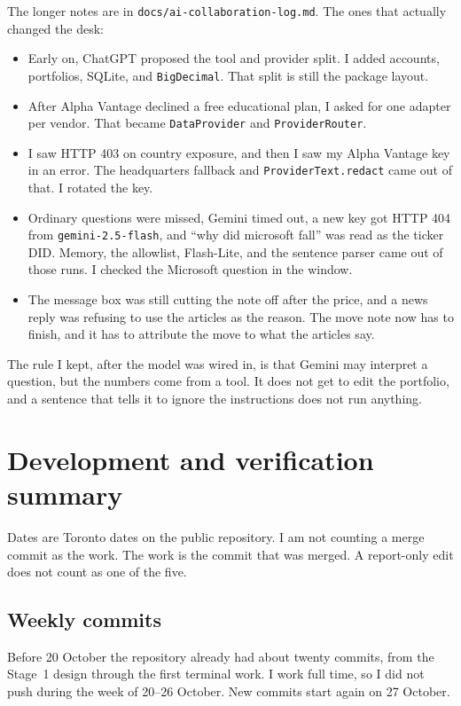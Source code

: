 \documentclass[11pt]{article}
\begin{document}
The longer notes are in \texttt{docs/ai-collaboration-log.md}. The ones that actually changed the desk:

\begin{itemize}
\item Early on, ChatGPT proposed the tool and provider split. I added accounts, portfolios, SQLite, and \texttt{BigDecimal}. That split is still the package layout.
\item After Alpha Vantage declined a free educational plan, I asked for one adapter per vendor. That became \texttt{DataProvider} and \texttt{ProviderRouter}.
\item I saw HTTP 403 on country exposure, and then I saw my Alpha Vantage key in an error. The headquarters fallback and \texttt{ProviderText.redact} came out of that. I rotated the key.
\item Ordinary questions were missed, Gemini timed out, a new key got HTTP 404 from \texttt{gemini-2.5-flash}, and ``why did microsoft fall'' was read as the ticker DID. Memory, the allowlist, Flash-Lite, and the sentence parser came out of those runs. I checked the Microsoft question in the window.
\item The message box was still cutting the note off after the price, and a news reply was refusing to use the articles as the reason. The move note now has to finish, and it has to attribute the move to what the articles say.
\end{itemize}

The rule I kept, after the model was wired in, is that Gemini may interpret a question, but the numbers come from a tool. It does not get to edit the portfolio, and a sentence that tells it to ignore the instructions does not run anything.

\section{Development and verification summary}

Dates are Toronto dates on the public repository. I am not counting a merge commit as the work. The work is the commit that was merged. A report-only edit does not count as one of the five.

\subsection{Weekly commits}
Before 20 October the repository already had about twenty commits, from the Stage~1 design through the first terminal work. I work full time, so I did not push during the week of 20--26 October. New commits start again on 27 October.
\end{document}
